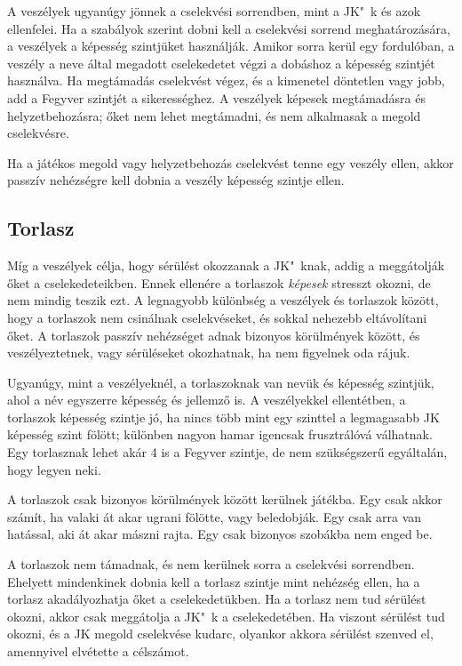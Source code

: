 A veszélyek ugyanúgy jönnek a cselekvési sorrendben, mint a JK"~k és azok ellenfelei. Ha a szabályok szerint dobni kell a cselekvési sorrend meghatározására, a veszélyek a képesség szintjüket használják. Amikor sorra kerül egy fordulóban, a veszély a neve által megadott cselekedetet végzi a dobáshoz a képesség szintjét használva. Ha megtámadás cselekvést végez, és a kimenetel döntetlen vagy jobb, add a Fegyver szintjét a sikerességhez. A veszélyek képesek megtámadásra és helyzetbehozásra; őket nem lehet megtámadni, és nem alkalmasak a megold cselekvésre.

Ha a játékos megold vagy helyzetbehozás cselekvést tenne egy veszély ellen, akkor passzív nehézségre kell dobnia a veszély képesség szintje ellen.

\newpage

\subsection{Torlasz}

Míg a veszélyek célja, hogy sérülést okozzanak a JK"~knak, addig a  meggátolják őket a cselekedeteikben. Ennek ellenére a torlaszok \emph{képesek} stresszt okozni, de nem mindig teszik ezt. A legnagyobb különbség a veszélyek és torlaszok között, hogy a torlaszok nem csinálnak cselekvéseket, és sokkal nehezebb eltávolítani őket. A torlaszok passzív nehézséget adnak bizonyos körülmények között, és veszélyeztetnek, vagy sérüléseket okozhatnak, ha nem figyelnek oda rájuk.

Ugyanúgy, mint a veszélyeknél, a torlaszoknak van nevük és képesség szintjük, ahol a név egyszerre képesség és jellemző is. A veszélyekkel ellentétben, a torlaszok képesség szintje jó, ha nincs több mint egy szinttel a legmagasabb JK képesség szint fölött; különben nagyon hamar igencsak frusztrálóvá válhatnak. Egy torlasznak lehet akár 4 is a Fegyver szintje, de nem szükségszerű egyáltalán, hogy legyen neki.

A torlaszok csak bizonyos körülmények között kerülnek játékba. Egy  csak akkor számít, ha valaki át akar ugrani fölötte, vagy beledobják. Egy  csak arra van hatással, aki át akar mászni rajta. Egy  csak bizonyos szobákba nem enged be.

A torlaszok nem támadnak, és nem kerülnek sorra a cselekvési sorrendben. Ehelyett mindenkinek dobnia kell a torlasz szintje mint nehézség ellen, ha a torlasz akadályozhatja őket a cselekedetükben. Ha a torlasz nem tud sérülést okozni, akkor csak meggátolja a JK"~k a cselekedetében. Ha viszont sérülést tud okozni, és a JK megold cselekvése kudarc, olyankor akkora sérülést szenved el, amennyivel elvétette a célszámot.

